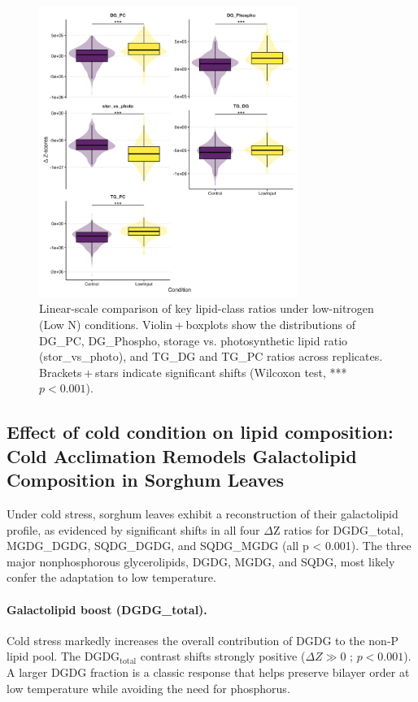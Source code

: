 \documentclass[10pt,letterpaper]{article}
\begin{document}
\begin{figure}[htbp]
  \centering
  \includegraphics[width=0.75\textwidth]{fig/main/Fig2b_lipid_ratio_linear_lowN.png}
  \caption{Linear-scale comparison of key lipid-class ratios under low-nitrogen (Low N) conditions.  Violin + boxplots show the distributions of DG\_PC, DG\_Phospho, storage vs. photosynthetic lipid ratio (stor\_vs\_photo), and TG\_DG and TG\_PC ratios across replicates.  Brackets + stars indicate significant shifts (Wilcoxon test, *** $p<0.001$).}
  \label{fig:2b_ratio_lowN}
\end{figure}



\subsection*{Effect of cold condition on lipid composition: Cold Acclimation Remodels Galactolipid Composition in Sorghum Leaves}

Under cold stress, sorghum leaves exhibit a reconstruction of their galactolipid profile, as evidenced by significant shifts in all four $\Delta$Z ratios for DGDG\_total, MGDG\_DGDG, SQDG\_DGDG, and SQDG\_MGDG (all p < 0.001). The three major nonphosphorous glycerolipids, DGDG, MGDG, and SQDG, most likely confer the adaptation to low temperature.

\paragraph{Galactolipid boost (DGDG_total).}
Cold stress markedly increases the overall contribution of DGDG to the non‑P lipid pool. The $\mathrm{DGDG}_{\mathrm{total}}$ contrast shifts strongly positive ($\Delta Z \gg 0$ ; $p < 0.001$). A larger DGDG fraction is a classic response that helps preserve bilayer order at low temperature while avoiding the need for phosphorus.
\end{document}

